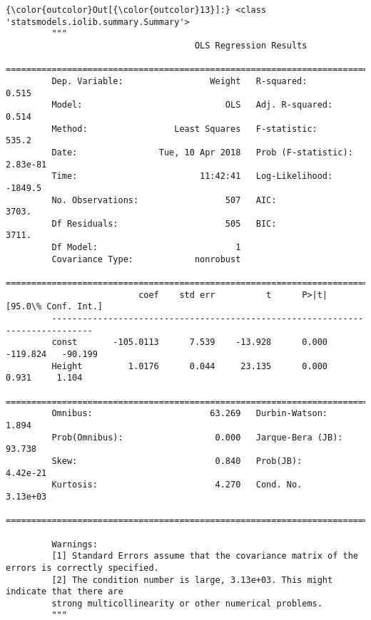 \documentclass[11pt]{article}
\begin{document}
\begin{Verbatim}[commandchars=\\\{\}]
{\color{outcolor}Out[{\color{outcolor}13}]:} <class 'statsmodels.iolib.summary.Summary'>
         """
                                     OLS Regression Results                            
         ==============================================================================
         Dep. Variable:                 Weight   R-squared:                       0.515
         Model:                            OLS   Adj. R-squared:                  0.514
         Method:                 Least Squares   F-statistic:                     535.2
         Date:                Tue, 10 Apr 2018   Prob (F-statistic):           2.83e-81
         Time:                        11:42:41   Log-Likelihood:                -1849.5
         No. Observations:                 507   AIC:                             3703.
         Df Residuals:                     505   BIC:                             3711.
         Df Model:                           1                                         
         Covariance Type:            nonrobust                                         
         ==============================================================================
                          coef    std err          t      P>|t|      [95.0\% Conf. Int.]
         ------------------------------------------------------------------------------
         const       -105.0113      7.539    -13.928      0.000      -119.824   -90.199
         Height         1.0176      0.044     23.135      0.000         0.931     1.104
         ==============================================================================
         Omnibus:                       63.269   Durbin-Watson:                   1.894
         Prob(Omnibus):                  0.000   Jarque-Bera (JB):               93.738
         Skew:                           0.840   Prob(JB):                     4.42e-21
         Kurtosis:                       4.270   Cond. No.                     3.13e+03
         ==============================================================================
         
         Warnings:
         [1] Standard Errors assume that the covariance matrix of the errors is correctly specified.
         [2] The condition number is large, 3.13e+03. This might indicate that there are
         strong multicollinearity or other numerical problems.
         """
\end{Verbatim}
            
\end{document}
